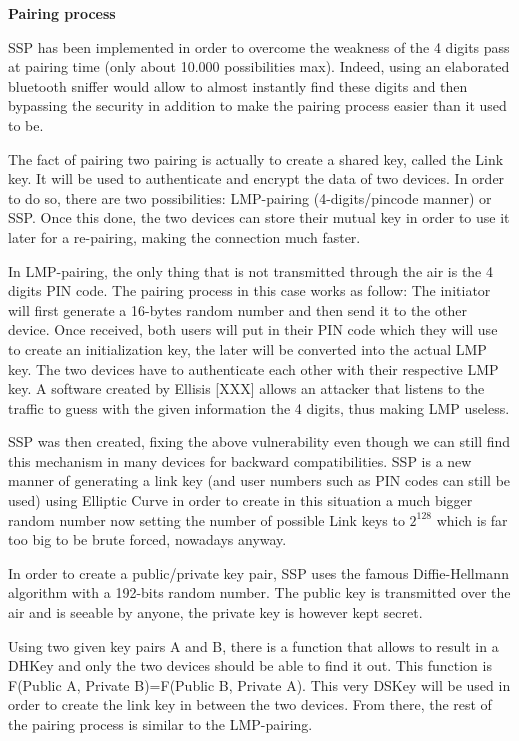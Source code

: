 \textbf{Pairing process}

SSP has been implemented in order to overcome the weakness of the 4 digits pass at pairing time (only about 10.000 possibilities max). Indeed, using an elaborated bluetooth sniffer would allow to almost instantly find these digits and then bypassing the security in addition to make the pairing process easier than it used to be.
	
The fact of pairing two pairing is actually to create a shared key, called the Link key. It will be used to authenticate and encrypt the data of two devices.
In order to do so, there are two possibilities: LMP-pairing (4-digits/pincode manner) or SSP. \linebreak 
Once this done, the two devices can store their mutual key in order to use it later for a re-pairing, making the connection much faster.

In LMP-pairing, the only thing that is not transmitted through the air is the 4 digits PIN code. The pairing process in this case works as follow: \linebreak 
The initiator will first generate a 16-bytes random number and then send it to the other device. Once received, both users will put in their PIN code which they will use to create an initialization key, the later will be converted into the actual LMP key. The two devices have to authenticate each other with their respective LMP key. \linebreak 
A software created by Ellisis [XXX] allows an attacker that listens to the traffic to guess with the given information the 4 digits, thus making LMP useless. 

SSP was then created, fixing the above vulnerability even though we can still find this mechanism in many devices for backward compatibilities. \linebreak 
SSP is a new manner of generating a link key (and user numbers such as PIN codes can still be used) using Elliptic Curve in order to create in this situation a much bigger random number now setting the number of possible Link keys to \(2^{128}\) which is far too big to be brute forced, nowadays anyway. 

In order to create a public/private key pair, SSP uses the famous Diffie-Hellmann algorithm with a 192-bits random number. The public key is transmitted over the air and is seeable by anyone, the private key is however kept secret. 

Using two given key pairs A and B, there is a function that allows to result in a DHKey and only the two devices should be able to find it out. This function is F(Public A, Private B)=F(Public B, Private A). This very DSKey will be used in order to create the link key in between the two devices. \linebreak 
From there, the rest of the pairing process is similar to the LMP-pairing.


